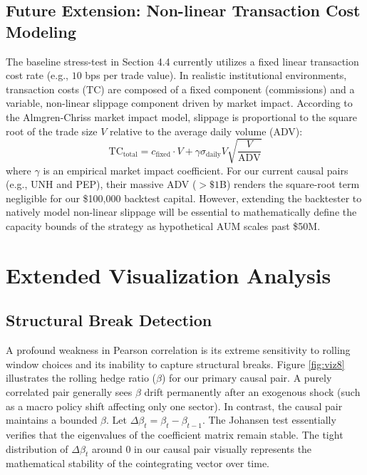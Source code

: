 \documentclass[12pt,a4paper]{article}
\begin{document}
\subsection{Future Extension: Non-linear Transaction Cost Modeling}
The baseline stress-test in Section 4.4 currently utilizes a fixed linear transaction cost rate (e.g., $10$ bps per trade value). In realistic institutional environments, transaction costs ($\text{TC}$) are composed of a fixed component (commissions) and a variable, non-linear slippage component driven by market impact. According to the Almgren-Chriss market impact model, slippage is proportional to the square root of the trade size $V$ relative to the average daily volume (ADV):
\begin{equation}
    \text{TC}_{\text{total}} = c_{\text{fixed}} \cdot V + \gamma \sigma_{\text{daily}} V \sqrt{\frac{V}{\text{ADV}}}
\end{equation}
where $\gamma$ is an empirical market impact coefficient. For our current causal pairs (e.g., UNH and PEP), their massive ADV ($>\$1$B) renders the square-root term negligible for our \$100,000 backtest capital. However, extending the backtester to natively model non-linear slippage will be essential to mathematically define the capacity bounds of the strategy as hypothetical AUM scales past \$50M.

\section{Extended Visualization Analysis}

\subsection{Structural Break Detection}
A profound weakness in Pearson correlation is its extreme sensitivity to rolling window choices and its inability to capture structural breaks. Figure \ref{fig:viz8} illustrates the rolling hedge ratio ($\beta$) for our primary causal pair. A purely correlated pair generally sees $\beta$ drift permanently after an exogenous shock (such as a macro policy shift affecting only one sector). In contrast, the causal pair maintains a bounded $\beta$. Let $\Delta \beta_t = \beta_t - \beta_{t-1}$. The Johansen test essentially verifies that the eigenvalues of the coefficient matrix remain stable. The tight distribution of $\Delta \beta_t$ around $0$ in our causal pair visually represents the mathematical stability of the cointegrating vector over time.
\end{document}
